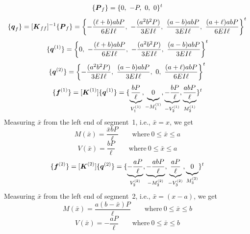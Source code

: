 \documentclass[11pt, oneside]{article}   	%
\newcommand{\vectr}[1]{\hbox{\boldmath$#1$}}
\begin{document}
\begin{equation}
   \{ \vectr{P}_f \} = \{ 0,~ -P,~ 0,~ 0 \}^t
   \label{D9}
\end{equation}
\begin{equation}
   \{ \vectr{q}_f \} = [ \vectr{K}_{ff} ]^{-1} \{ \vectr{P}_f \}
   =
   \left\{
       -\frac{(\ell + b) a b P}{6 EI \ell}, ~
       -\frac{(a^2 b^2 P)}{3 EI \ell}, ~
       \frac{(a - b) a b P}{3 EI \ell}, ~
       \frac{(a + \ell) a b P}{6 EI \ell} \right\}^t
   \label{D10}
\end{equation}
\begin{equation}
   \{ \vectr{q}^{(1)} \} 
   =
   \left\{
       0 ,~
       -\frac{(\ell + b) a b P}{6 EI \ell}, ~
       -\frac{(a^2 b^2 P)}{3 EI \ell}, ~
       \frac{(a - b) a b P}{3 EI \ell}
       \right\}^t
   \label{D11}
\end{equation}
\begin{equation}
   \{ \vectr{q}^{(2)} \} 
   =
   \left\{
       -\frac{(a^2 b^2 P)}{3 EI \ell}, ~
       \frac{(a - b) a b P}{3 EI \ell}, ~
       0 ,~
       \frac{(a + \ell) a b P}{6 EI \ell} \right\}^t
   \label{D12}
\end{equation}
\begin{equation}
   \{ \vectr{f}^{(1)} \} 
   = [ \vectr{K}^{(1)} ] \{ \vectr{q}^{(1)} \} 
   = \{  
       \underbrace{ \frac{b P}{\ell} }_{V_1^{(1)}}, 
       \underbrace{ 0\strut }_{ -M_1^{(1)} }, 
       \underbrace{ -\frac{b P}{\ell} }_{-V_2^{(1)}}, 
       \underbrace{ \frac{a b P}{\ell} }_{M_2^{(1)}}
      \}^t
   \label{D13}
\end{equation}
Measuring $\bar x$ from the left end of segment~1, i.e., $\bar x = x$, we get
\begin{equation}
   M(\bar x) = \frac{\bar x b P}{\ell}
   \qquad \text{where}~ 0\le \bar x\le a
   \label{D15}
\end{equation}
\begin{equation}
   V(\bar x) = \frac{b P}{\ell} 
   \qquad \text{where}~ 0\le \bar x\le a
   \label{D16}
\end{equation}
\begin{equation}
   \{ \vectr{f}^{(2)} \} 
   = [ \vectr{K}^{(2)} ] \{ \vectr{q}^{(2)} \} 
   = \{  
       \underbrace{ -\frac{a P}{\ell} }_{V_2^{(2)}}, 
       \underbrace{ -\frac{a b P}{\ell} }_{-M_2^{(2)}}, 
       \underbrace{ \frac{a P}{\ell} }_{-V_3^{(2)}}, 
       \underbrace{ 0\strut }_{M_3^{(2)}}
      \}^t
   \label{D14}
\end{equation}
Measuring $\bar x$ from the left end of segment~2, i.e., $\bar x = (x-a)$, we get
\begin{equation}
   M(\bar x) = \frac{ a (b -\bar x) P}{\ell}
   \qquad \text{where}~ 0\le \bar x\le b
   \label{D17}
\end{equation}
\begin{equation}
   V(\bar x) = -\frac{a P}{\ell} 
   \qquad \text{where}~ 0\le \bar x\le b
   \label{D18}
\end{equation}
\end{document}
